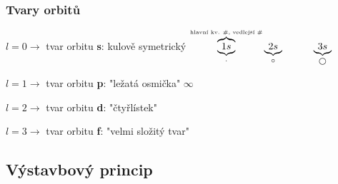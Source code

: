 \subsubsection{Tvary orbitů}
\vspace{2em}
\raggedright
\TabPositions{0em, 20em}
$l = 0 \to$ tvar orbitu \textbf{s}: kulově symetrický
\tab
$\overbrace{\underbrace{1s}_{\cdot}}^{\text{\tiny{hlavní kv. \#, vedlejší \#}}}  \underbrace{2s}_{\circ} \hspace{3em} \underbrace{3s}_{\bigcirc}$

\vspace{2em}
\raggedright
$l = 1 \to $ tvar orbitu \textbf{p}: "ležatá osmička" \tab \hspace{2em} \huge{$\infty$}

\normalsize

$l = 2 \to $ tvar orbitu \textbf{d}: "čtyřlístek" %

\vspace{2em}

$l = 3 \to $ tvar orbitu \textbf{f}: "velmi složitý tvar"


\raggedright

\subsection{Výstavbový princip}
